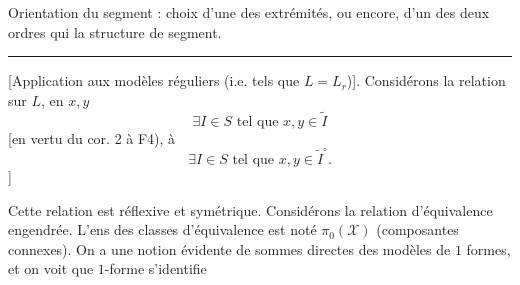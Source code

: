 
Orientation du segment : choix d'une des extrémités, ou encore, d'un des deux ordres qui  la structure de segment.

\begin{center}\rule{3cm}{0.4pt}\end{center}

[Application aux modèles réguliers (i.e. tels que $L=L_r$)]. Considérons la relation sur $L$, en $x,y$
\[
\exists I\in S\text{ tel que }x,y\in\tilde I
\]
[en vertu du cor. 2 à F4),   à
\[
\exists I\in S\text{ tel que }x,y\in\tilde I^\circ.
\]
]

Cette relation est réflexive et symétrique. Considérons la relation d'équivalence engendrée. L'ens des classes d'équivalence est noté $\pi_0(\mathcal X)$ (composantes connexes). On a une notion évidente de sommes directes des modèles de $1$ formes, et on voit que  $1$-forme s'identifie


